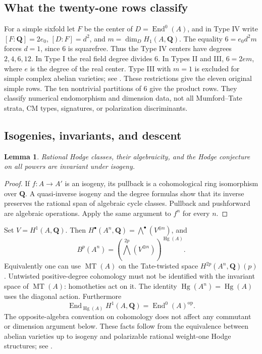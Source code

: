 \documentclass[11pt,reqno]{article}
\theoremstyle{emphasizedplain}
\theoremstyle{emphasizeddefinition}
\theoremstyle{emphasizeddefinition}
\newtheorem{prelemma}{Lemma}
\DeclareMathOperator{\End}{End}
\DeclareMathOperator{\Hg}{Hg}
\DeclareMathOperator{\MT}{MT}
\newcommand{\Q}{\mathbf Q}
\newcommand{\B}{B}
\begin{document}
\subsection*{What the twenty-one rows classify}
For a simple sixfold let $F$ be the center of $D=\End^0(A)$, and in Type IV
write $[F:\Q]=2e_0$, $[D:F]=d^2$, and $m=\dim_D H_1(A,\Q)$.
The equality $6=e_0d^2m$ forces $d=1$, since $6$ is squarefree.
Thus the Type IV centers have degrees $2,4,6,12$. In Type I the real field
degree divides $6$. In Types II and III, $6=2em$, where $e$ is the degree of
the real center. Type III with $m=1$ is excluded for simple complex abelian
varieties; see \cite[\S3.2]{Vial}. These restrictions give the eleven original
simple rows. The ten nontrivial partitions of $6$ give the product rows.
They classify numerical endomorphism and dimension data, not all
Mumford--Tate strata, CM types, signatures, or polarization discriminants.

\subsection*{Isogenies, invariants, and descent}
\begin{prelemma}\label{p:isogeny}
Rational Hodge classes, their algebraicity, and the Hodge conjecture on all
powers are invariant under isogeny.
\end{prelemma}
\begin{proof}
If $f:A\to A'$ is an isogeny, its pullback is a cohomological ring
isomorphism over $\Q$. A quasi-inverse isogeny and the degree formulas show
that its inverse preserves the rational span of algebraic cycle classes.
Pullback and pushforward are algebraic operations. Apply the same argument
to $f^n$ for every $n$.
\end{proof}
Set $V=H^1(A,\Q)$. Then $H^\bullet(A^n,\Q)=\bigwedge^\bullet(V^{\oplus n})$,
and
\[
 \B^p(A^n)=\left(\bigwedge^{2p}(V^{\oplus n})\right)^{\Hg(A)}.
\]
Equivalently one can use $\MT(A)$ on the Tate-twisted space
$H^{2p}(A^n,\Q)(p)$. Untwisted positive-degree cohomology must not be
identified with the invariant space of $\MT(A)$: homotheties act on it.
The identity $\Hg(A^n)=\Hg(A)$ uses the diagonal action.
Furthermore
\[
 \End_{\Hg(A)}H^1(A,\Q)=\End^0(A)^{\mathrm{op}}.
\]
The opposite-algebra convention on cohomology does not affect any commutant
or dimension argument below. These facts follow from the equivalence between
abelian varieties up to isogeny and polarizable rational weight-one Hodge
structures; see \cite[\S\S1--2]{Moonen}.
\end{document}
